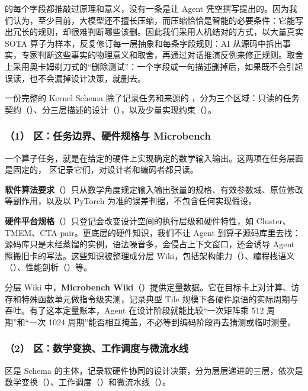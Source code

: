  的每个字段都推敲过原理和意义，没有一条是让 Agent 凭空撰写提出的。因为我们认为，至少目前，大模型还不擅长压缩，而压缩恰恰是智能的必要条件：它能写出冗长的规则，却很难判断哪些该删。因此我们采用人机结对的方式，以大量真实 SOTA 算子为样本，反复修订每一层抽象和每条字段规则：AI 从源码中拆出事实，专家判断这些事实的物理意义和取舍，再通过对话推演反例来修正规则。取舍上采用奥卡姆剃刀式的“删除测试”：一个字段或一句描述删掉后，如果既不会引起误读，也不会漏掉设计决策，就删去。


一份完整的 Kernel Schema 除了记录任务和来源的 ，分为三个区域：只读的任务契约（）、分三层描述的设计（），以及少量实现约束（）。


\subsubsection{（1） 区：任务边界、硬件规格与 Microbench}
一个算子任务，就是在给定的硬件上实现确定的数学输入输出。这两项在任务层面是固定的， 区记录它们，对设计者和编码者都只读。


\textbf{软件算法要求}（）只从数学角度规定输入输出张量的规格、有效参数域、原位修改等副作用，以及以 PyTorch  为准的误差判据，不包含任何实现假设。


\textbf{硬件平台规格}（）只登记会改变设计空间的执行层级和硬件特性，如 Cluster、TMEM、CTA-pair。更底层的硬件知识，我们不让 Agent 到算子源码库里去找：源码库只是未经蒸馏的实例，语法噪音多，会侵占上下文窗口，还会诱导 Agent 照搬旧卡的写法。这些知识被整理成分层 Wiki，包括架构能力（）、编程栈语义（）、性能剖析（）等。


分层 Wiki 中，\textbf{Microbench Wiki}（）提供定量数据。它在目标卡上对计算、访存和特殊函数单元做指令级实测，记录典型 Tile 规模下各硬件原语的实际周期与吞吐。有了这本定量账本，Agent 在设计阶段就能比较“一次矩阵乘 512 周期”和“一次  1024 周期”能否相互掩盖，不必等到编码阶段再去猜测或临时测量。


\subsubsection{（2） 区：数学变换、工作调度与微流水线}
 区是 Schema 的主体，记录软硬件协同的设计决策，分为层层递进的三层，依次是数学变换（）、工作调度（）和微流水线（）。



